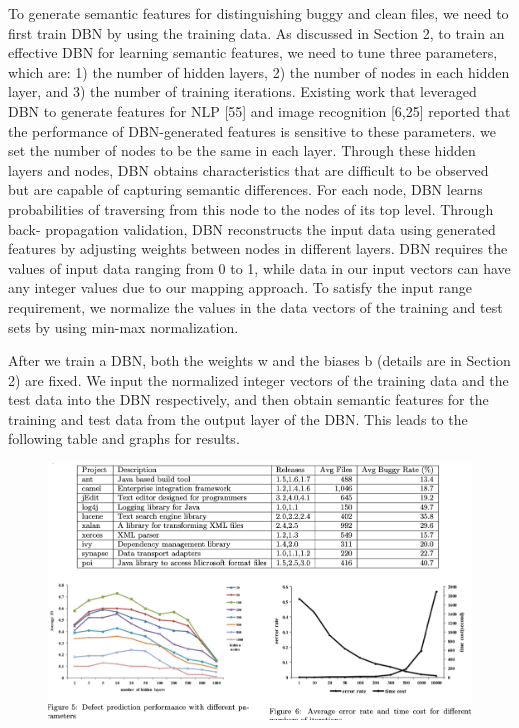 \documentclass{article}
\begin{document}
To generate semantic features for distinguishing buggy and clean files, we need to first train DBN by using the training data. As discussed in Section 2, to train an effective DBN for learning semantic features, we need to tune three parameters, which are: 1) the number of hidden layers, 2) the number of nodes in each hidden layer, and 3) the number of training iterations. Existing work that leveraged DBN to generate features for NLP [55] and image recognition [6,25] reported that the performance of DBN-generated features is sensitive to these parameters. we set the number of nodes to be the same in each layer. Through these hidden layers and nodes, DBN obtains characteristics that are difficult to be observed but are capable of capturing semantic differences. For each node, DBN learns probabilities of traversing from this node to the nodes of its top level. Through back- propagation validation, DBN reconstructs the input data using generated features by adjusting weights between nodes in different layers.
DBN requires the values of input data ranging from 0 to 1, while data in our input vectors can have any integer values due to our mapping approach. To satisfy the input range requirement, we normalize the values in the data vectors of the training and test sets by using min-max normalization.

After we train a DBN, both the weights w and the biases b (details are in Section 2) are fixed. We input the normalized integer vectors of the training data and the test data into the DBN respectively, and then obtain semantic features for the training and test data from the output layer of the DBN.
This leads to the following table and graphs for results.

\begin{figure}[ht]
\vskip 0.2in
\begin{center}
\centerline{\includegraphics[width=\columnwidth]{Images/Bug2-1.png}}
\label{icml-historical}
\end{center}
\vskip -0.2in
\end{figure}
\end{document}
